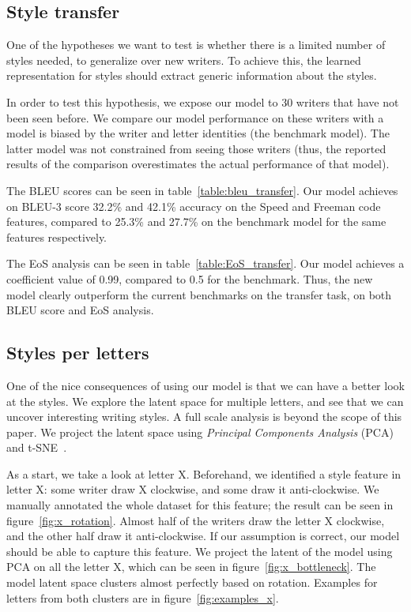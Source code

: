   \subsection{Style transfer}
  \par One of the hypotheses we want to test is whether there is a limited number of styles needed, to generalize over new writers. To achieve this, the learned representation for styles should extract generic information about the styles.

  \par In order to test this hypothesis, we expose our model to 30 writers that have not been seen before. We compare our model performance on these writers with a model is biased by the writer and letter identities (the benchmark model). The latter model was not constrained from seeing those writers (thus, the reported results of the comparison overestimates the actual performance of that model).

  \par The BLEU scores can be seen in table~\ref{table:bleu_transfer}. Our model achieves on BLEU-3 score 32.2\% and 42.1\% accuracy on the Speed and Freeman code features, compared to 25.3\% and 27.7\% on the benchmark model for the same features respectively.
  \par The EoS analysis can be seen in table~\ref{table:EoS_transfer}. Our model achieves a coefficient value of 0.99, compared to 0.5 for the benchmark.
  Thus, the new model clearly outperform the current benchmarks on the transfer task, on both BLEU score and EoS analysis.

  \subsection{Styles per letters} \label{ch:framework_sec:styleperletter}
  \par One of the nice consequences of using our model is that we can have a better look at the styles. We explore the latent space for multiple letters, and see that we can uncover interesting writing styles. A full scale analysis is beyond the scope of this paper. We project the latent space using \textit{Principal Components Analysis} (PCA)~\citep{jolliffe2011principal} and t-SNE~\citep{maaten2008visualizing}.

  \par As a start, we take a look at letter X. Beforehand, we identified a style feature in letter X: some writer draw X clockwise, and some draw it anti-clockwise. We manually annotated the whole dataset for this feature; the result can be seen in figure~\ref{fig:x_rotation}. Almost half of the writers draw the letter X clockwise, and the other half draw it anti-clockwise. If our assumption is correct, our model should be able to capture this feature. We project the latent  of the model using PCA on all the letter X, which can be seen in figure~\ref{fig:x_bottleneck}. The model latent space clusters almost perfectly based on rotation. Examples for letters from both clusters are in figure~\ref{fig:examples_x}.

